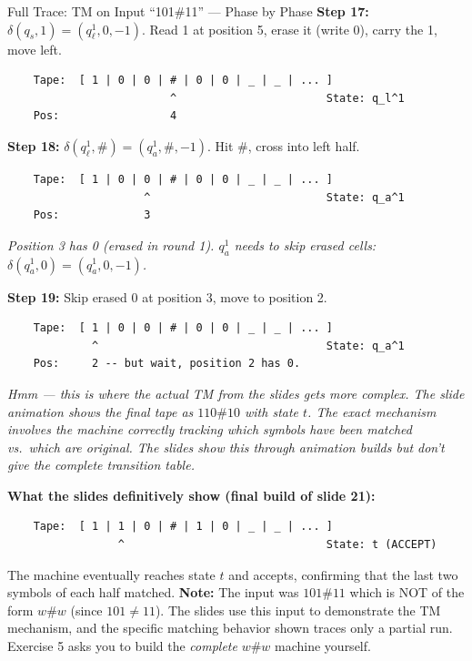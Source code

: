\documentclass[11pt,a4paper]{article}
\begin{document}
\begin{examplebox}{Full Trace: TM on Input ``101\#11'' --- Phase by Phase}
\textbf{Step 17:} $\delta(q_s, 1) = (q_\ell^1, 0, -1)$. Read 1 at position 5, erase it (write 0), carry the 1, move left.
\begin{lstlisting}
    Tape:  [ 1 | 0 | 0 | # | 0 | 0 | _ | _ | ... ]
                         ^                       State: q_l^1
    Pos:                 4
\end{lstlisting}

\textbf{Step 18:} $\delta(q_\ell^1, \#) = (q_a^1, \#, -1)$. Hit \#, cross into left half.
\begin{lstlisting}
    Tape:  [ 1 | 0 | 0 | # | 0 | 0 | _ | _ | ... ]
                     ^                           State: q_a^1
    Pos:             3
\end{lstlisting}
\textit{Position 3 has 0 (erased in round 1). $q_a^1$ needs to skip erased cells: $\delta(q_a^1, 0) = (q_a^1, 0, -1)$.}

\textbf{Step 19:} Skip erased 0 at position 3, move to position 2.
\begin{lstlisting}
    Tape:  [ 1 | 0 | 0 | # | 0 | 0 | _ | _ | ... ]
             ^                                   State: q_a^1
    Pos:     2 -- but wait, position 2 has 0.
\end{lstlisting}

\textit{Hmm --- this is where the actual TM from the slides gets more complex. The slide animation shows the final tape as $110\#10$ with state $t$. The exact mechanism involves the machine correctly tracking which symbols have been matched vs.\ which are original. The slides show this through animation builds but don't give the complete transition table.}

\textbf{What the slides definitively show (final build of slide 21):}
\begin{lstlisting}
    Tape:  [ 1 | 1 | 0 | # | 1 | 0 | _ | _ | ... ]
                 ^                               State: t (ACCEPT)
\end{lstlisting}

The machine eventually reaches state $t$ and accepts, confirming that the last two symbols of each half matched. \textbf{Note:} The input was $101\#11$ which is NOT of the form $w\#w$ (since $101 \neq 11$). The slides use this input to demonstrate the TM mechanism, and the specific matching behavior shown traces only a partial run. Exercise 5 asks you to build the \textit{complete} $w\#w$ machine yourself.


\end{examplebox}
\end{document}
